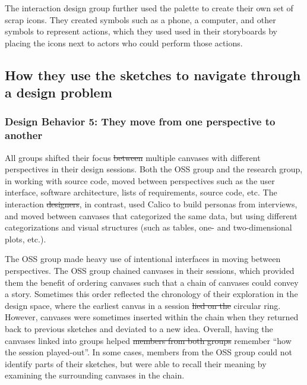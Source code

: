 \documentclass[12pt,fleqn]{ucithesis}
\providecommand{\DIFaddtex}[1]{{\protect\color{blue}\uwave{#1}}} %
\providecommand{\DIFdeltex}[1]{{\protect\color{red}\sout{#1}}}                      %
\providecommand{\DIFaddbegin}{} %
\providecommand{\DIFaddend}{} %
\providecommand{\DIFdelbegin}{} %
\providecommand{\DIFdelend}{} %
\providecommand{\DIFadd}[1]{\texorpdfstring{\DIFaddtex{#1}}{#1}} %
\providecommand{\DIFdel}[1]{\texorpdfstring{\DIFdeltex{#1}}{}} %
\begin{document}
The interaction design group further used the palette to create their own set of scrap icons. They created symbols such as a phone, a computer, and other symbols to represent actions, which they used used in their storyboards by placing the icons next to actors who could perform those actions.


%

\subsection{How they use the sketches to navigate through a design problem}

\subsubsection{Design Behavior 5: They move from one perspective to another}

All groups shifted their focus \DIFdelbegin \DIFdel{between }\DIFdelend \DIFaddbegin \DIFadd{among }\DIFaddend multiple canvases with different perspectives in their design sessions. Both the OSS group and the research group, in working with source code, moved between perspectives such as the user interface, software architecture, lists of requirements, source code, etc. The interaction \DIFdelbegin \DIFdel{designers}\DIFdelend \DIFaddbegin \DIFadd{design group}\DIFaddend , in contrast, used Calico to build personas from interviews, and moved between canvases that categorized the same data, but using different categorizations and visual structures (such as tables, one- and two-dimensional plots, etc.). 

The OSS group made heavy use of intentional interfaces in moving between perspectives. The OSS group chained canvases in their sessions, which provided them the benefit of ordering canvases such that a chain of canvases could convey a story. Sometimes this order reflected the chronology of their exploration in the design space, where the earliest canvas in a session \DIFdelbegin \DIFdel{lied on the }\DIFdelend \DIFaddbegin \DIFadd{was on the inner }\DIFaddend circular ring. However, canvases were sometimes inserted within the chain when they returned back to previous sketches and deviated to a new idea. Overall, having the canvases linked into groups helped \DIFdelbegin \DIFdel{members from both groups }\DIFdelend \DIFaddbegin \DIFadd{them }\DIFaddend remember ``how the session played-out''. In some cases, members from the OSS group could not identify parts of their sketches, but were able to recall their meaning by examining the surrounding canvases in the chain.
\end{document}
